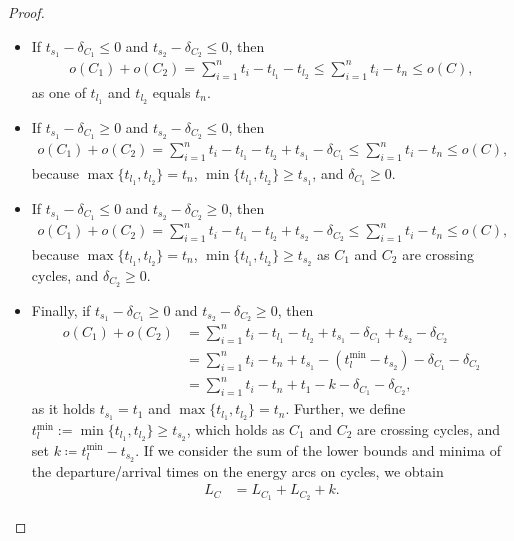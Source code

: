 \documentclass[10pt,a4paper]{amsart}
\begin{document}
\begin{proof}
	\begin{itemize}
		\item If $t_{s_1} - \delta_{C_1} \leq 0$ and $t_{s_2} - \delta_{C_2} \leq 0$, then 
		\begin{align*}
			o(C_1) + o(C_2) = \sum_{i=1}^n t_i - t_{l_1} - t_{l_2} \leq \sum_{i=1}^n t_i - t_n \leq o(C),
		\end{align*}
		as one of $t_{l_1}$ and $t_{l_2}$ equals $t_n$.
		\item If $t_{s_1} - \delta_{C_1} \geq 0$ and $t_{s_2} - \delta_{C_2} \leq 0$, then 
		\begin{align*}
			o(C_1) + o(C_2) = \sum_{i=1}^n t_i - t_{l_1} - t_{l_2} + t_{s_1} - \delta_{C_1} \leq \sum_{i=1}^n t_i - t_n \leq o(C),
		\end{align*}
		because $\max\{t_{l_1}, t_{l_2}\} = t_n$, $\min\{t_{l_1}, t_{l_2}\} \geq t_{s_1}$, and $\delta_{C_1} \geq 0$.
		\item If $t_{s_1} - \delta_{C_1} \leq 0$ and $t_{s_2} - \delta_{C_2} \geq 0$, then 
		\begin{align*}
			o(C_1) + o(C_2) = \sum_{i=1}^n t_i - t_{l_1} - t_{l_2} + t_{s_2} - \delta_{C_2} \leq \sum_{i=1}^n t_i - t_n \leq o(C),
		\end{align*}
		because $\max\{t_{l_1}, t_{l_2}\} = t_n$, $\min\{t_{l_1}, t_{l_2}\} \geq t_{s_2}$ as $C_1$ and $C_2$ are crossing cycles, and $\delta_{C_2} \geq 0$.
		\item Finally, if $t_{s_1} - \delta_{C_1} \geq 0$ and $t_{s_2} - \delta_{C_2} \geq 0$, then
		\begin{align*}
			o(C_1) + o(C_2) &= \sum_{i=1}^n t_i - t_{l_1} - t_{l_2} + t_{s_1} - \delta_{C_1} + t_{s_2} - \delta_{C_2}\\ & = \sum_{i=1}^n t_i - t_{n} + t_{s_1} - (t^{\min}_{l} - t_{s_2}) - \delta_{C_1} - \delta_{C_2}  \\
            &= \sum_{i=1}^n t_i - t_{n} + t_1 - k  - \delta_{C_1} - \delta_{C_2},
		\end{align*}
		as it holds $t_{s_1} = t_1$ and $\max\{t_{l_1}, t_{l_2}\} = t_n$. Further, we define $t^{\min}_{l}:= \min\{t_{l_1}, t_{l_2}\} \geq t_{s_2}$, which holds as $C_1$ and $C_2$ are crossing cycles, and set $k \coloneqq t^{\min}_{l}- t_{s_2}$.
        If we consider the sum of the lower bounds and minima of the departure/arrival times on the energy arcs on cycles, we obtain
        \begin{align*}
            L_C &= L_{C_1} + L_{C_2} + k.
        \end{align*}


\end{itemize}
\end{proof}
\end{document}

